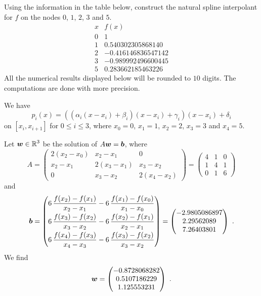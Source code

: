 \begin{egg}
Using the information in the table below, construct the natural spline
interpolant for $f$ on the nodes $0$, $1$, $2$, $3$ and $5$.
\[
\begin{array}{c|c}
x & f(x) \\
\hline
0 & 1 \\
1 & 0.540302305868140 \\
2 & -0.416146836547142 \\
3 & -0.989992496600445 \\
5 & 0.283662185463226
\end{array}
\]
All the numerical results displayed below will be rounded to $10$
digits.  The computations are done with more precision.

We have
\[
p_i(x) = \left(\left(\alpha_i(x-x_i) + \beta_i\right)(x-x_i)
+\gamma_i\right)(x-x_i) + \delta_i
\]
on $[x_i,x_{i+1}]$ for $0\leq i \leq 3$, where $x_0=0$, $x_1=1$,
$x_2=2$, $x_3=3$ and $x_4=5$.

Let $\displaystyle \bm{w} \in \mathbb{R}^3$ be the solution of
$A\bm{w} = \bm{b}$, where
\[
A = \begin{pmatrix}
2 (x_2-x_0) & x_2-x_1 & 0 \\
x_2-x_1 & 2(x_3-x_1) & x_3-x_2 \\
0 & x_3-x_2 & 2(x_4-x_2)
\end{pmatrix}
= \begin{pmatrix}
4 & 1 & 0 \\
1 & 4 & 1 \\
0 & 1 & 6
\end{pmatrix}
\]
and
\[
\bm{b} = \begin{pmatrix}
\displaystyle 6\,\frac{f(x_2) - f(x_1)}{x_2-x_1} -
6\,\frac{f(x_1) - f(x_0)}{x_1-x_0} \\[0.8em]
\displaystyle 6\,\frac{f(x_3) - f(x_2)}{x_3-x_2} -
6\,\frac{f(x_2) - f(x_1)}{x_2-x_1} \\[0.8em]
\displaystyle 6\,\frac{f(x_4) - f(x_3)}{x_4-x_3} -
6\,\frac{f(x_3) - f(x_2)}{x_3-x_2}
\end{pmatrix}
= \begin{pmatrix}
-2.9805086897 \\
2.29562089 \\
7.26403801
\end{pmatrix} \ .
\]
We find
\[
\bm{w} = \begin{pmatrix}
-0.8728068282 \\ 0.5107186229 \\ 1.125553231
\end{pmatrix} \ .
\]


\end{egg}
